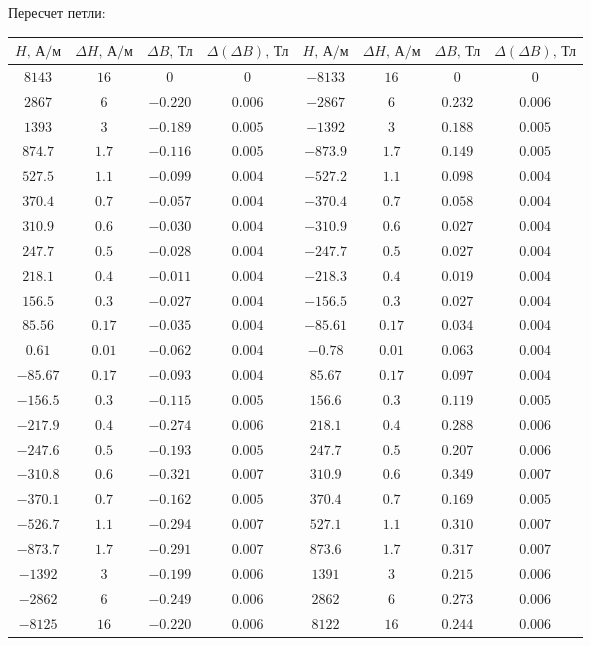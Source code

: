 \documentclass[a4paper]{article}
\begin{document}
\begin{enumerate}
Пересчет петли:
\begin{center}
\begin{tabular}{|c|c|c|c|c|c|c|c|}\hline
$H\text{, А/м}$&$\Delta H\text{, А/м}$&$\Delta B\text{, Тл}$&$\Delta (\Delta B)\text{, Тл}$&$H\text{, А/м}$&$\Delta H\text{, А/м}$&$\Delta B\text{, Тл}$&$\Delta (\Delta B)\text{, Тл}$\\\hline
$8143$&$16$&$0$&$0$&$-8133$&$16$&$0$&$0$\\\hline
$2867$&$6$&$-0.220$&$0.006$&$-2867$&$6$&$0.232$&$0.006$\\\hline
$1393$&$3$&$-0.189$&$0.005$&$-1392$&$3$&$0.188$&$0.005$\\\hline
$874.7$&$1.7$&$-0.116$&$0.005$&$-873.9$&$1.7$&$0.149$&$0.005$\\\hline
$527.5$&$1.1$&$-0.099$&$0.004$&$-527.2$&$1.1$&$0.098$&$0.004$\\\hline
$370.4$&$0.7$&$-0.057$&$0.004$&$-370.4$&$0.7$&$0.058$&$0.004$\\\hline
$310.9$&$0.6$&$-0.030$&$0.004$&$-310.9$&$0.6$&$0.027$&$0.004$\\\hline
$247.7$&$0.5$&$-0.028$&$0.004$&$-247.7$&$0.5$&$0.027$&$0.004$\\\hline
$218.1$&$0.4$&$-0.011$&$0.004$&$-218.3$&$0.4$&$0.019$&$0.004$\\\hline
$156.5$&$0.3$&$-0.027$&$0.004$&$-156.5$&$0.3$&$0.027$&$0.004$\\\hline
$85.56$&$0.17$&$-0.035$&$0.004$&$-85.61$&$0.17$&$0.034$&$0.004$\\\hline
$0.61$&$0.01$&$-0.062$&$0.004$&$-0.78$&$0.01$&$0.063$&$0.004$\\\hline
$-85.67$&$0.17$&$-0.093$&$0.004$&$85.67$&$0.17$&$0.097$&$0.004$\\\hline
$-156.5$&$0.3$&$-0.115$&$0.005$&$156.6$&$0.3$&$0.119$&$0.005$\\\hline
$-217.9$&$0.4$&$-0.274$&$0.006$&$218.1$&$0.4$&$0.288$&$0.006$\\\hline
$-247.6$&$0.5$&$-0.193$&$0.005$&$247.7$&$0.5$&$0.207$&$0.006$\\\hline
$-310.8$&$0.6$&$-0.321$&$0.007$&$310.9$&$0.6$&$0.349$&$0.007$\\\hline
$-370.1$&$0.7$&$-0.162$&$0.005$&$370.4$&$0.7$&$0.169$&$0.005$\\\hline
$-526.7$&$1.1$&$-0.294$&$0.007$&$527.1$&$1.1$&$0.310$&$0.007$\\\hline
$-873.7$&$1.7$&$-0.291$&$0.007$&$873.6$&$1.7$&$0.317$&$0.007$\\\hline
$-1392$&$3$&$-0.199$&$0.006$&$1391$&$3$&$0.215$&$0.006$\\\hline
$-2862$&$6$&$-0.249$&$0.006$&$2862$&$6$&$0.273$&$0.006$\\\hline
$-8125$&$16$&$-0.220$&$0.006$&$8122$&$16$&$0.244$&$0.006$\\\hline
\end{tabular}\\~\\
\end{center}


\end{enumerate}
\end{document}
